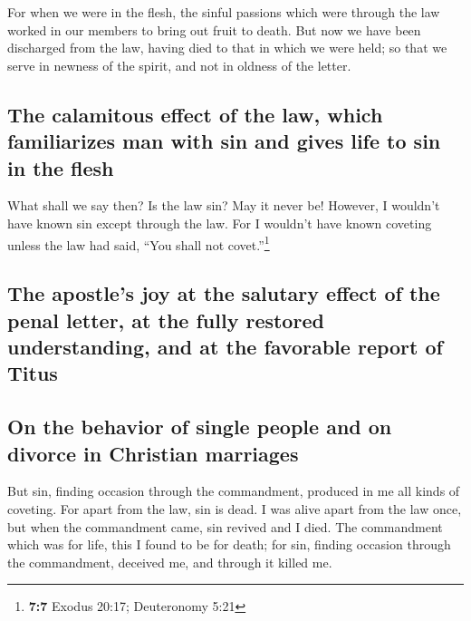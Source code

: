  For when we were in the flesh, the sinful passions which
were through the law worked in our members to bring out fruit to death.
 But now we have been discharged from the law, having died
to that in which we were held; so that we serve in newness of the
spirit, and not in oldness of the letter.

\hypertarget{the-calamitous-effect-of-the-law-which-familiarizes-man-with-sin-and-gives-life-to-sin-in-the-flesh}{%
\subsection{The calamitous effect of the law, which familiarizes man
with sin and gives life to sin in the
flesh}\label{the-calamitous-effect-of-the-law-which-familiarizes-man-with-sin-and-gives-life-to-sin-in-the-flesh}}

 What shall we say then? Is the law sin? May it never be!
However, I wouldn't have known sin except through the law. For I
wouldn't have known coveting unless the law had said, ``You shall not
covet.''\footnote{\textbf{7:7} Exodus 20:17; Deuteronomy 5:21}

\hypertarget{the-apostles-joy-at-the-salutary-effect-of-the-penal-letter-at-the-fully-restored-understanding-and-at-the-favorable-report-of-titus}{%
\subsection{The apostle's joy at the salutary effect of the penal
letter, at the fully restored understanding, and at the favorable report
of
Titus}\label{the-apostles-joy-at-the-salutary-effect-of-the-penal-letter-at-the-fully-restored-understanding-and-at-the-favorable-report-of-titus}}

\hypertarget{on-the-behavior-of-single-people-and-on-divorce-in-christian-marriages}{%
\subsection{On the behavior of single people and on divorce in Christian
marriages}\label{on-the-behavior-of-single-people-and-on-divorce-in-christian-marriages}}

 But sin, finding occasion through the commandment,
produced in me all kinds of coveting. For apart from the law, sin is
dead.  I was alive apart from the law once, but when the
commandment came, sin revived and I died.  The
commandment which was for life, this I found to be for death;
 for sin, finding occasion through the commandment,
deceived me, and through it killed me.

